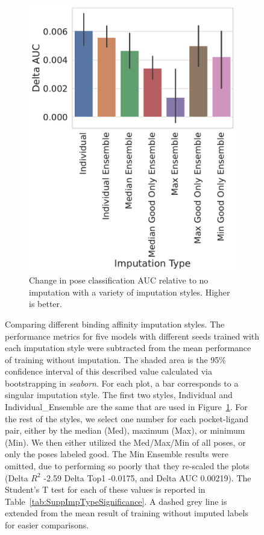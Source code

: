 \documentclass[journal=jcisd8,manuscript=article]{achemso}
\begin{document}
\begin{figure}[tbph]
\begin{subfigure}[t]{0.30\textwidth}
        \includegraphics[width=\linewidth]{figures/ComparingImpStylesAUC.pdf}
        \caption{Change in pose classification AUC relative to no imputation with a variety of imputation styles. Higher is better.}
    \end{subfigure}
    \caption{Comparing different binding affinity imputation styles. The performance metrics for five models with different seeds trained with each imputation style were subtracted from the mean performance of training without imputation. The shaded area is the 95\% confidence interval of this described value calculated via bootstrapping in \textit{seaborn}. For each plot, a bar corresponds to a singular imputation style. The first two styles, Individual and Individual\_Ensemble are the same that are used in Figure~\ref{fig:SuppcompareImp}. For the rest of the styles, we select one number for each pocket-ligand pair, either by the median (Med), maximum (Max), or minimum (Min). We then either utilized the Med/Max/Min of all poses, or only the poses labeled good. The Min Ensemble results were omitted, due to performing so poorly that they re-scaled the plots (Delta $R^2$ -2.59 Delta Top1 -0.0175, and Delta AUC 0.00219). The Student's T test for each of these values is reported in Table~\ref{tab:SuppImpTypeSignificance}.  A dashed grey line is extended from the mean result of training without imputed labels for easier comparisons.}
    \label{fig:SuppcompareImp}
\end{figure}
\end{document}
